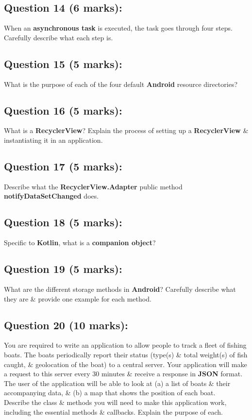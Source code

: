 \documentclass{article}
\begin{document}
\subsection*{Question 14 (6 marks):}
When an \textbf{asynchronous task} is executed, the task goes through four steps. Carefully describe what each step is.

\subsection*{Question 15 (5 marks):}
What is the purpose of each of the four default \textbf{Android} resource directories?

\subsection*{Question 16 (5 marks):}
What is a \textbf{RecyclerView}? Explain the process of setting up a \textbf{RecyclerView} \& instantiating it in an application.

\subsection*{Question 17 (5 marks):}
Describe what the \textbf{RecyclerView.Adapter} public method \textbf{notifyDataSetChanged} does.

\subsection*{Question 18 (5 marks):}
Specific to \textbf{Kotlin}, what is a \textbf{companion object}?

\subsection*{Question 19 (5 marks):}
What are the different storage methods in \textbf{Android}? Carefully describe what they are \& provide one example for each method.

\subsection*{Question 20 (10 marks):}
You are required to write an application to allow people to track a fleet of fishing boats. The boats periodically report their status (type(s) \& total weight(s) of fish caught, \& geolocation of the boat) to a central server. Your application will make a request to this server every 30 minutes \& receive a response in \textbf{JSON} format. The user of the application will be able to look at (a) a list of boats \& their accompanying data, \& (b) a map that shows the position of each boat. \\

Describe the class \& methods you will need to make this application work, including the essential methods \& callbacks. Explain the purpose of each.
\end{document}
